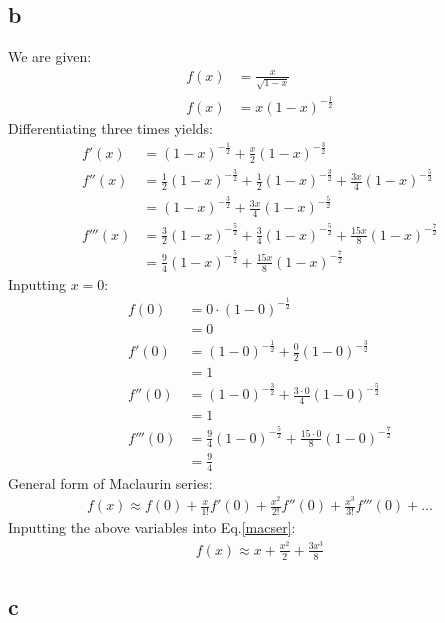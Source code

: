 \documentclass[11pt]{article}
\numberwithin{equation}{section}
\begin{document}
\subsection*{b}
We are given:
\begin{align}
	f(x) &= \frac{x}{\sqrt{1-x}}\\
	f(x) &= x\left( 1 - x \right)^{-\frac{1}{2}}
\end{align}
Differentiating three times yields:
\begin{align}
	f'(x) &= \left(1 - x \right)^{-\frac{1}{2}} + \frac{x}{2} \left( 1-x\right)^{-\frac{3}{2}}\\
	f''(x) &= \frac{1}{2} \left( 1- x\right)^{-\frac{3}{2}} + \frac{1}{2} \left( 1- x\right)^{-\frac{3}{2}} + \frac{3x}{4} \left( 1-x \right)^{-\frac{5}{2}}\\
	&= \left( 1-x \right)^{-\frac{3}{2}} + \frac{3x}{4} \left( 1-x \right)^{-\frac{5}{2}} \\
	f'''(x) &= \frac{3}{2} \left( 1-x \right)^{-\frac{5}{2}} + \frac{3}{4} \left( 1-x \right)^{-\frac{5}{2}} + \frac{15x}{8} \left( 1-x \right)^{-\frac{7}{2}}\\
	&= \frac{9}{4} \left( 1-x \right)^{-\frac{5}{2}} + \frac{15x}{8} \left( 1-x \right)^{-\frac{7}{2}}
\end{align}
Inputting $x=0$:
\begin{align}
	f(0) &= 0 \cdot \left( 1 - 0 \right)^{-\frac{1}{2}}\\
	&= 0\\
	f'(0) &= \left(1 - 0 \right)^{-\frac{1}{2}} + \frac{0}{2} \left( 1-0\right)^{-\frac{3}{2}}\\
	&= 1\\
	f''(0) &= \left( 1-0 \right)^{-\frac{3}{2}} + \frac{3\cdot 0}{4} \left( 1-0 \right)^{-\frac{5}{2}}\\
	&= 1\\
	f'''(0) &= \frac{9}{4} \left( 1-0 \right)^{-\frac{5}{2}} + \frac{15 \cdot 0}{8} \left( 1-0 \right)^{-\frac{7}{2}}\\
	&= \frac{9}{4}
\end{align}
General form of Maclaurin series:
\begin{align}
	f(x) \approx f(0) + \frac{x}{1!}f'(0) + \frac{x^2}{2!}f''(0) + \frac{x^3}{3!}f'''(0) + ... \label{macser}
\end{align}
Inputting the above variables into Eq.\ref{macser}:
\begin{align}
	f(x) \approx x + \frac{x^2}{2} + \frac{3x^3}{8}	
\end{align}
\subsection*{c}
\end{document}
